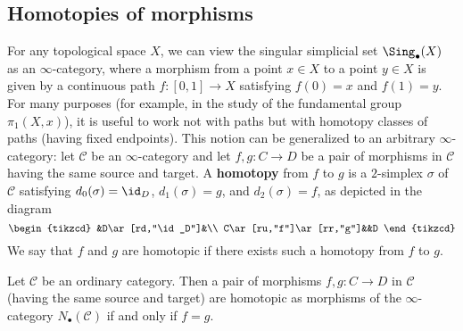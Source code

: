 \subsection{Homotopies of morphisms}
For any topological space $X$, we can view the singular simplicial set $\Sing_\bullet(X)$ as an $\infty$-category, where a morphism from a point $x\in X$ to a point $y\in X$ is given by a continuous path $f:[0,1]\to X$ satisfying $f(0)=x$ and $f(1)=y$. For many purposes (for example, in the study of the fundamental group $\pi_1(X,x)$), it is useful to work not with paths but with homotopy classes of paths (having fixed endpoints). This notion can be generalized to an arbitrary $\infty$-category: let $\mathcal{C}$ be an $\infty$-category and let $f,g:C\to D$ be a pair of morphisms in $\mathcal{C}$ having the same source and target. A \textbf{homotopy} from $f$ to $g$ is a $2$-simplex $\sigma$ of $\mathcal{C}$ satisfying $d_0(\sigma)=\id_D$, $d_1(\sigma)=g$, and $d_2(\sigma)=f$, as depicted in the diagram
\[\begin{tikzcd}
&D\ar[rd,"\id_D"]&\\
C\ar[ru,"f"]\ar[rr,"g"]&&D
\end{tikzcd}\]
We say that $f$ and $g$ are homotopic if there exists such a homotopy from $f$ to $g$.
\begin{example}
Let $\mathcal{C}$ be an ordinary category. Then a pair of morphisms $f,g:C\to D$ in $\mathcal{C}$ (having the same source and target) are homotopic as morphisms of the $\infty$-category $N_\bullet(\mathcal{C})$ if and only if $f=g$.
\end{example}
